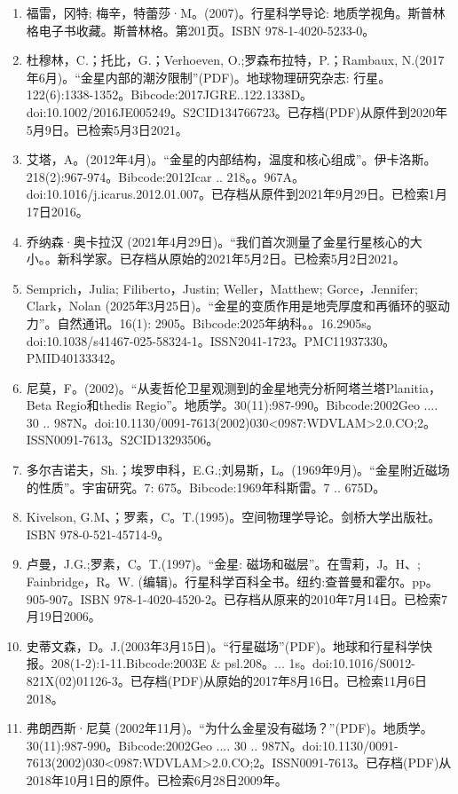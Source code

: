 \begin{enumerate}
\item 福雷，冈特; 梅辛，特蕾莎·M。(2007)。行星科学导论: 地质学视角。斯普林格电子书收藏。斯普林格。第201页。ISBN 978-1-4020-5233-0。
\item 杜穆林，C.；托比，G.；Verhoeven, O.;罗森布拉特，P.；Rambaux, N.(2017年6月)。“金星内部的潮汐限制”(PDF)。地球物理研究杂志: 行星。122(6):1338-1352。Bibcode:2017JGRE..122.1338D。doi:10.1002/2016JE005249。S2CID134766723。已存档(PDF)从原件到2020年5月9日。已检索5月3日2021。  
\item 艾塔，A。(2012年4月)。“金星的内部结构，温度和核心组成”。伊卡洛斯。218(2):967-974。Bibcode:2012Icar .. 218。。967A。doi:10.1016/j.icarus.2012.01.007。已存档从原件到2021年9月29日。已检索1月17日2016。
\item 乔纳森·奥卡拉汉 (2021年4月29日)。“我们首次测量了金星行星核心的大小。。新科学家。已存档从原始的2021年5月2日。已检索5月2日2021。
\item Semprich，Julia; Filiberto，Justin; Weller，Matthew; Gorce，Jennifer; Clark，Nolan (2025年3月25日)。“金星的变质作用是地壳厚度和再循环的驱动力”。自然通讯。16(1): 2905。Bibcode:2025年纳科。。16.2905s。doi:10.1038/s41467-025-58324-1。ISSN2041-1723。PMC11937330。PMID40133342。   
\item 尼莫，F。(2002)。“从麦哲伦卫星观测到的金星地壳分析阿塔兰塔Planitia，Beta Regio和thedis Regio”。地质学。30(11):987-990。Bibcode:2002Geo .... 30 .. 987N。doi:10.1130/0091-7613(2002)030<0987:WDVLAM>2.0.CO;2。ISSN0091-7613。S2CID13293506。  
\item 多尔吉诺夫，Sh.；埃罗申科，E.G.;刘易斯，L。(1969年9月)。“金星附近磁场的性质”。宇宙研究。7: 675。Bibcode:1969年科斯雷。7 .. 675D。
\item Kivelson, G.M、；罗素，C。T.(1995)。空间物理学导论。剑桥大学出版社。ISBN 978-0-521-45714-9。
\item 卢曼，J.G.;罗素，C。T.(1997)。“金星: 磁场和磁层”。在雪莉，J。H、; Fainbridge，R。W. (编辑)。行星科学百科全书。纽约:查普曼和霍尔。pp。 905-907。ISBN 978-1-4020-4520-2。已存档从原来的2010年7月14日。已检索7月19日2006。
\item 史蒂文森，D。J.(2003年3月15日)。“行星磁场”(PDF)。地球和行星科学快报。208(1-2):1-11.Bibcode:2003E & psl.208。... 1s。doi:10.1016/S0012-821X(02)01126-3。已存档(PDF)从原始的2017年8月16日。已检索11月6日2018。
\item 弗朗西斯·尼莫 (2002年11月)。“为什么金星没有磁场？”(PDF)。地质学。30(11):987-990。Bibcode:2002Geo .... 30 .. 987N。doi:10.1130/0091-7613(2002)030<0987:WDVLAM>2.0.CO;2。ISSN0091-7613。已存档(PDF)从2018年10月1日的原件。已检索6月28日2009年。  

\end{enumerate}
